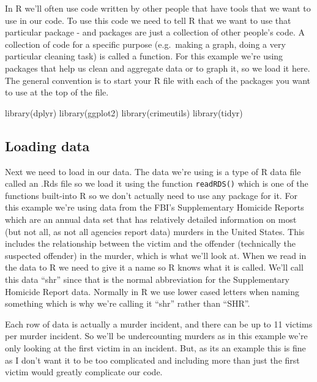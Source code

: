 \documentclass[
]{krantz}
\makeatletter
\newenvironment{Shaded}{\begin{snugshade}}{\end{snugshade}}
\newcommand{\FunctionTok}[1]{\textcolor[rgb]{0,0,0}{#1}}
\newcommand{\NormalTok}[1]{#1}
\newenvironment{kframe}{%
\medskip{}
\setlength{\fboxsep}{.8em}
 \def\at@end@of@kframe{}%
 \ifinner\ifhmode%
  \def\at@end@of@kframe{\end{minipage}}%
  \begin{minipage}{\columnwidth}%
 \fi\fi%
 \def\FrameCommand##1{\hskip\@totalleftmargin \hskip-\fboxsep
 \colorbox{shadecolor}{##1}\hskip-\fboxsep
     \hskip-\linewidth \hskip-\@totalleftmargin \hskip\columnwidth}%
 \MakeFramed {\advance\hsize-\width
   \@totalleftmargin\z@ \linewidth\hsize
   \@setminipage}}%
 {\par\unskip\endMakeFramed%
 \at@end@of@kframe}
\renewenvironment{Shaded}{\begin{kframe}}{\end{kframe}}
\makeatother
\begin{document}
In R we'll often use code written by other people that have tools that we want to use in our code. To use this code we need to tell R that we want to use that particular package - and packages are just a collection of other people's code. A collection of code for a specific purpose (e.g.~making a graph, doing a very particular cleaning task) is called a function. For this example we're using packages that help us clean and aggregate data or to graph it, so we load it here. The general convention is to start your R file with each of the packages you want to use at the top of the file.

\begin{Shaded}
\begin{Highlighting}[]
\FunctionTok{library}\NormalTok{(dplyr)    }
\FunctionTok{library}\NormalTok{(ggplot2)    }
\FunctionTok{library}\NormalTok{(crimeutils) }
\FunctionTok{library}\NormalTok{(tidyr)      }
\end{Highlighting}
\end{Shaded}

\hypertarget{loading-data}{%
\subsection{Loading data}\label{loading-data}}

Next we need to load in our data. The data we're using is a type of R data file called an .Rds file so we load it using the function \texttt{readRDS()} which is one of the functions built-into R so we don't actually need to use any package for it. For this example we're using data from the FBI's Supplementary Homicide Reports which are an annual data set that has relatively detailed information on most (but not all, as not all agencies report data) murders in the United States. This includes the relationship between the victim and the offender (technically the suspected offender) in the murder, which is what we'll look at. When we read in the data to R we need to give it a name so R knows what it is called. We'll call this data ``shr'' since that is the normal abbreviation for the Supplementary Homicide Report data. Normally in R we use lower cased letters when naming something which is why we're calling it ``shr'' rather than ``SHR''.

Each row of data is actually a murder incident, and there can be up to 11 victims per murder incident. So we'll be undercounting murders as in this example we're only looking at the first victim in an incident. But, as its an example this is fine as I don't want it to be too complicated and including more than just the first victim would greatly complicate our code.
\end{document}
